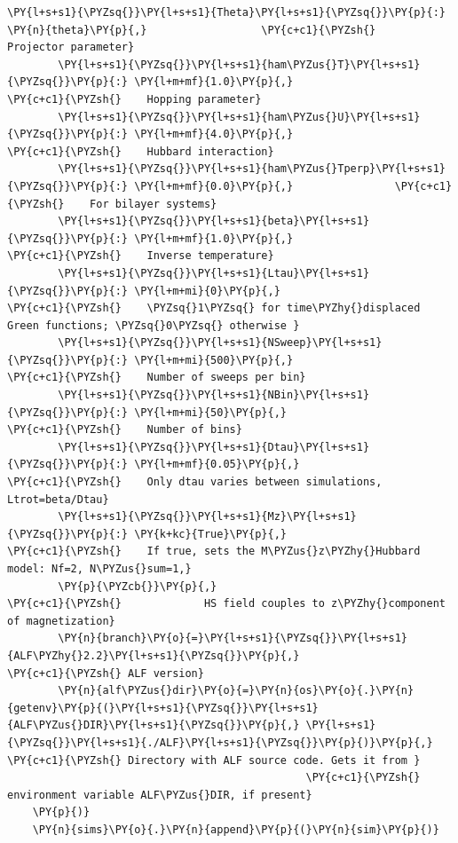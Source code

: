\begin{tcolorbox}[breakable, size=fbox, boxrule=1pt, pad at break*=1mm,colback=cellbackground, colframe=cellborder]
\begin{Verbatim}[commandchars=\\\{\}]
        \PY{l+s+s1}{\PYZsq{}}\PY{l+s+s1}{Theta}\PY{l+s+s1}{\PYZsq{}}\PY{p}{:} \PY{n}{theta}\PY{p}{,}                  \PY{c+c1}{\PYZsh{}    Projector parameter}
        \PY{l+s+s1}{\PYZsq{}}\PY{l+s+s1}{ham\PYZus{}T}\PY{l+s+s1}{\PYZsq{}}\PY{p}{:} \PY{l+m+mf}{1.0}\PY{p}{,}                    \PY{c+c1}{\PYZsh{}    Hopping parameter}
        \PY{l+s+s1}{\PYZsq{}}\PY{l+s+s1}{ham\PYZus{}U}\PY{l+s+s1}{\PYZsq{}}\PY{p}{:} \PY{l+m+mf}{4.0}\PY{p}{,}                    \PY{c+c1}{\PYZsh{}    Hubbard interaction}
        \PY{l+s+s1}{\PYZsq{}}\PY{l+s+s1}{ham\PYZus{}Tperp}\PY{l+s+s1}{\PYZsq{}}\PY{p}{:} \PY{l+m+mf}{0.0}\PY{p}{,}                \PY{c+c1}{\PYZsh{}    For bilayer systems}
        \PY{l+s+s1}{\PYZsq{}}\PY{l+s+s1}{beta}\PY{l+s+s1}{\PYZsq{}}\PY{p}{:} \PY{l+m+mf}{1.0}\PY{p}{,}                     \PY{c+c1}{\PYZsh{}    Inverse temperature}
        \PY{l+s+s1}{\PYZsq{}}\PY{l+s+s1}{Ltau}\PY{l+s+s1}{\PYZsq{}}\PY{p}{:} \PY{l+m+mi}{0}\PY{p}{,}                       \PY{c+c1}{\PYZsh{}    \PYZsq{}1\PYZsq{} for time\PYZhy{}displaced Green functions; \PYZsq{}0\PYZsq{} otherwise }
        \PY{l+s+s1}{\PYZsq{}}\PY{l+s+s1}{NSweep}\PY{l+s+s1}{\PYZsq{}}\PY{p}{:} \PY{l+m+mi}{500}\PY{p}{,}                   \PY{c+c1}{\PYZsh{}    Number of sweeps per bin}
        \PY{l+s+s1}{\PYZsq{}}\PY{l+s+s1}{NBin}\PY{l+s+s1}{\PYZsq{}}\PY{p}{:} \PY{l+m+mi}{50}\PY{p}{,}                      \PY{c+c1}{\PYZsh{}    Number of bins}
        \PY{l+s+s1}{\PYZsq{}}\PY{l+s+s1}{Dtau}\PY{l+s+s1}{\PYZsq{}}\PY{p}{:} \PY{l+m+mf}{0.05}\PY{p}{,}                    \PY{c+c1}{\PYZsh{}    Only dtau varies between simulations, Ltrot=beta/Dtau}
        \PY{l+s+s1}{\PYZsq{}}\PY{l+s+s1}{Mz}\PY{l+s+s1}{\PYZsq{}}\PY{p}{:} \PY{k+kc}{True}\PY{p}{,}                      \PY{c+c1}{\PYZsh{}    If true, sets the M\PYZus{}z\PYZhy{}Hubbard model: Nf=2, N\PYZus{}sum=1,}
        \PY{p}{\PYZcb{}}\PY{p}{,}                               \PY{c+c1}{\PYZsh{}             HS field couples to z\PYZhy{}component of magnetization}
        \PY{n}{branch}\PY{o}{=}\PY{l+s+s1}{\PYZsq{}}\PY{l+s+s1}{ALF\PYZhy{}2.2}\PY{l+s+s1}{\PYZsq{}}\PY{p}{,}                \PY{c+c1}{\PYZsh{} ALF version}
        \PY{n}{alf\PYZus{}dir}\PY{o}{=}\PY{n}{os}\PY{o}{.}\PY{n}{getenv}\PY{p}{(}\PY{l+s+s1}{\PYZsq{}}\PY{l+s+s1}{ALF\PYZus{}DIR}\PY{l+s+s1}{\PYZsq{}}\PY{p}{,} \PY{l+s+s1}{\PYZsq{}}\PY{l+s+s1}{./ALF}\PY{l+s+s1}{\PYZsq{}}\PY{p}{)}\PY{p}{,} \PY{c+c1}{\PYZsh{} Directory with ALF source code. Gets it from }
                                               \PY{c+c1}{\PYZsh{} environment variable ALF\PYZus{}DIR, if present}
    \PY{p}{)}
    \PY{n}{sims}\PY{o}{.}\PY{n}{append}\PY{p}{(}\PY{n}{sim}\PY{p}{)}
\end{Verbatim}
\end{tcolorbox}

